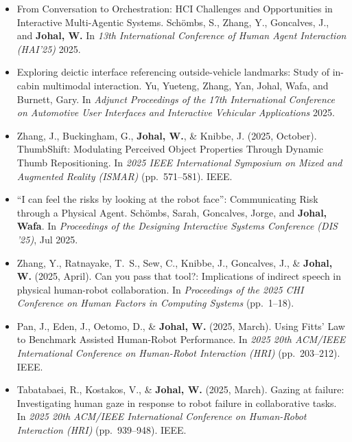 \begin{itemize}[nosep]
    \renewcommand\labelitemi{$\bullet$}

    \item From Conversation to Orchestration: HCI Challenges and Opportunities in Interactive Multi-Agentic Systems. Schömbs, S., Zhang, Y., Goncalves, J., and \textbf{Johal, W.} In \textit{13th International Conference of Human Agent Interaction (HAI'25)} 2025.

    \item Exploring deictic interface referencing outside-vehicle landmarks: Study of in-cabin multimodal interaction. Yu, Yueteng, Zhang, Yan, Johal, Wafa, and Burnett, Gary. In \textit{Adjunct Proceedings of the 17th International Conference on Automotive User Interfaces and Interactive Vehicular Applications} 2025.

    \item Zhang, J., Buckingham, G., \textbf{Johal, W.}, \& Knibbe, J. (2025, October). ThumbShift: Modulating Perceived Object Properties Through Dynamic Thumb Repositioning. In \textit{2025 IEEE International Symposium on Mixed and Augmented Reality (ISMAR)} (pp.\ 571--581). IEEE.

    \item ``I can feel the risks by looking at the robot face'': Communicating Risk through a Physical Agent. Schömbs, Sarah, Goncalves, Jorge, and \textbf{Johal, Wafa}. In \textit{Proceedings of the Designing Interactive Systems Conference (DIS '25)}, Jul 2025.

    \item Zhang, Y., Ratnayake, T.\ S., Sew, C., Knibbe, J., Goncalves, J., \& \textbf{Johal, W.} (2025, April). Can you pass that tool?: Implications of indirect speech in physical human-robot collaboration. In \textit{Proceedings of the 2025 CHI Conference on Human Factors in Computing Systems} (pp.\ 1--18).

    \item Pan, J., Eden, J., Oetomo, D., \& \textbf{Johal, W.} (2025, March). Using Fitts' Law to Benchmark Assisted Human-Robot Performance. In \textit{2025 20th ACM/IEEE International Conference on Human-Robot Interaction (HRI)} (pp.\ 203--212). IEEE.

    \item Tabatabaei, R., Kostakos, V., \& \textbf{Johal, W.} (2025, March). Gazing at failure: Investigating human gaze in response to robot failure in collaborative tasks. In \textit{2025 20th ACM/IEEE International Conference on Human-Robot Interaction (HRI)} (pp.\ 939--948). IEEE.


\end{itemize}
